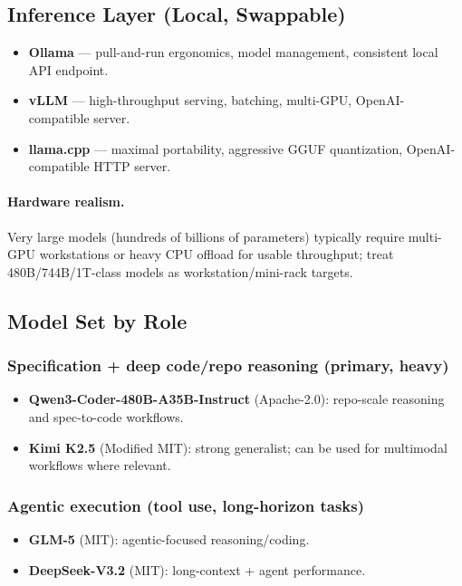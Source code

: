 \documentclass[11pt]{article}
\begin{document}
\subsection{Inference Layer (Local, Swappable)}

\begin{itemize}
  \item \textbf{Ollama} --- pull-and-run ergonomics, model management, consistent local API endpoint.
  \item \textbf{vLLM} --- high-throughput serving, batching, multi-GPU, OpenAI-compatible server.
  \item \textbf{llama.cpp} --- maximal portability, aggressive GGUF quantization, OpenAI-compatible HTTP server.
\end{itemize}

\paragraph{Hardware realism.}
Very large models (hundreds of billions of parameters) typically require multi-GPU workstations
or heavy CPU offload for usable throughput; treat 480B/744B/1T-class models as workstation/mini-rack targets.

\subsection{Model Set by Role}

\subsubsection{Specification + deep code/repo reasoning (primary, heavy)}
\begin{itemize}
  \item \textbf{Qwen3-Coder-480B-A35B-Instruct} (Apache-2.0): repo-scale reasoning and spec-to-code workflows.
  \item \textbf{Kimi K2.5} (Modified MIT): strong generalist; can be used for multimodal workflows where relevant.
\end{itemize}

\subsubsection{Agentic execution (tool use, long-horizon tasks)}
\begin{itemize}
  \item \textbf{GLM-5} (MIT): agentic-focused reasoning/coding.
  \item \textbf{DeepSeek-V3.2} (MIT): long-context + agent performance.
\end{itemize}
\end{document}
